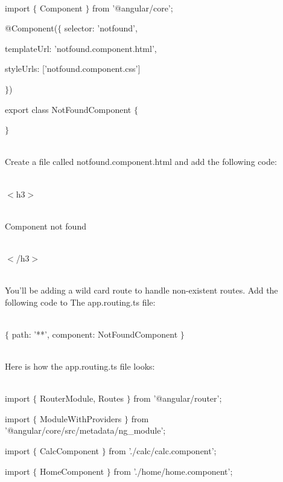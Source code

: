 \documentclass{article}
\begin{document}
\noindent \\ import $\mathrm{\{}$ Component $\mathrm{\}}$ from '@angular/core';

\noindent @Component($\mathrm{\{}$ selector: 'notfound',

\noindent templateUrl: 'notfound.component.html',

\noindent  

\noindent 

\noindent  

\noindent styleUrls: ['notfound.component.css']

\noindent $\mathrm{\}}$)

\noindent export class NotFoundComponent $\mathrm{\{}$

\noindent 

\noindent $\mathrm{\}}$

\noindent \\ Create a file called notfound.component.html and add the following code:

\noindent \\ $\mathrm{<}$h3$\mathrm{>}$

\noindent \\ Component not found

\noindent \\ $\mathrm{<}$/h3$\mathrm{>}$

\noindent 

\noindent \\ You'll be adding a wild card route to handle non-existent routes. Add the following code to The app.routing.ts file:

\noindent \\ $\mathrm{\{}$ path: '**', component: NotFoundComponent $\mathrm{\}}$

\noindent 

\noindent \\ Here is how the app.routing.ts file looks:

\noindent \\ import $\mathrm{\{}$ RouterModule, Routes $\mathrm{\}}$ from '@angular/router'; 

\noindent import $\mathrm{\{}$ ModuleWithProviders $\mathrm{\}}$ from '@angular/core/src/metadata/ng\_module';

\noindent import $\mathrm{\{}$ CalcComponent $\mathrm{\}}$ from './calc/calc.component'; 

\noindent import $\mathrm{\{}$ HomeComponent $\mathrm{\}}$ from './home/home.component';
\end{document}
